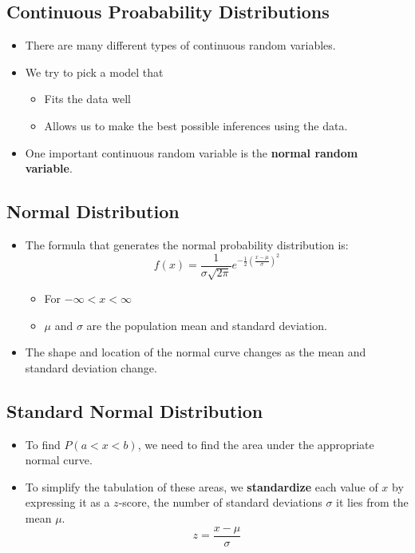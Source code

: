 \documentclass[12pt, letterpaper]{article}
\begin{document}
        \subsection*{Continuous Proabability Distributions}
            \begin{itemize}
                \item There are many different types of continuous random variables.
                \item We try to pick a model that
                    \begin{itemize}
                        \item Fits the data well
                        \item Allows us to make the best possible inferences using the data.
                    \end{itemize}
                \item One important continuous random variable is the \textbf{normal random variable}.
            \end{itemize}

        \subsection{Normal Distribution}
            \begin{itemize}
                \item The formula that generates the normal probability distribution is:
                \begin{equation}
                    f(x) = \frac{1}{\sigma\sqrt{2\pi}}e^{-\frac{1}{2}\left(\frac{x-\mu}{\sigma}\right)^2}
                \end{equation}
                    \begin{itemize}
                        \item For $-\infty < x < \infty$
                        \item $\mu$ and $\sigma$ are the population mean and standard deviation.
                    \end{itemize}
                \item The shape and location of the normal curve changes as the mean and standard deviation change.
            \end{itemize}

        \subsection{Standard Normal Distribution}
            \begin{itemize}
                \item To find $P(a < x < b)$, we need to find the area under the appropriate normal curve.
                \item To simplify the tabulation of these areas, we \textbf{standardize} each value of $x$ by expressing it as a $z$-score, the number of standard deviations $\sigma$ it lies from the mean $\mu$.
                    \begin{equation}
                        z = \frac{x-\mu}{\sigma}
                    \end{equation}
            \end{itemize}
\end{document}
